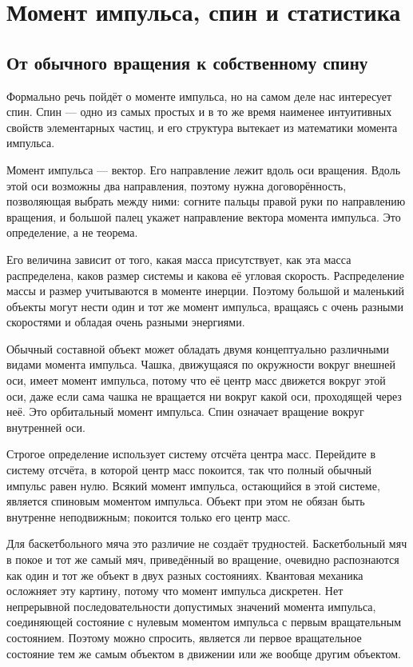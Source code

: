 \chapter{Момент импульса, спин и статистика}

\section{От обычного вращения к собственному спину}

Формально речь пойдёт о моменте импульса, но на самом деле нас интересует спин. Спин — одно из самых простых и в то же время наименее интуитивных свойств элементарных частиц, и его структура вытекает из математики момента импульса.

Момент импульса — вектор. Его направление лежит вдоль оси вращения. Вдоль этой оси возможны два направления, поэтому нужна договорённость, позволяющая выбрать между ними: согните пальцы правой руки по направлению вращения, и большой палец укажет направление вектора момента импульса. Это определение, а не теорема.

Его величина зависит от того, какая масса присутствует, как эта масса распределена, каков размер системы и какова её угловая скорость. Распределение массы и размер учитываются в моменте инерции. Поэтому большой и маленький объекты могут нести один и тот же момент импульса, вращаясь с очень разными скоростями и обладая очень разными энергиями.

Обычный составной объект может обладать двумя концептуально различными видами момента импульса. Чашка, движущаяся по окружности вокруг внешней оси, имеет момент импульса, потому что её центр масс движется вокруг этой оси, даже если сама чашка не вращается ни вокруг какой оси, проходящей через неё. Это орбитальный момент импульса. Спин означает вращение вокруг внутренней оси.

Строгое определение использует систему отсчёта центра масс. Перейдите в систему отсчёта, в которой центр масс покоится, так что полный обычный импульс равен нулю. Всякий момент импульса, остающийся в этой системе, является спиновым моментом импульса. Объект при этом не обязан быть внутренне неподвижным; покоится только его центр масс.

Для баскетбольного мяча это различие не создаёт трудностей. Баскетбольный мяч в покое и тот же самый мяч, приведённый во вращение, очевидно распознаются как один и тот же объект в двух разных состояниях. Квантовая механика осложняет эту картину, потому что момент импульса дискретен. Нет непрерывной последовательности допустимых значений момента импульса, соединяющей состояние с нулевым моментом импульса с первым вращательным состоянием. Поэтому можно спросить, является ли первое вращательное состояние тем же самым объектом в движении или же вообще другим объектом.

